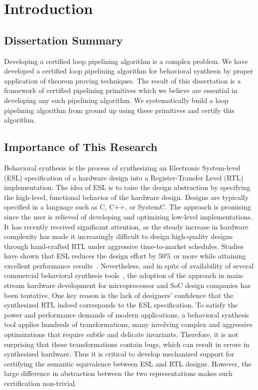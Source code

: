 \chapter{Introduction}
\label{sec:dissertation-thesis}

\section {Dissertation Summary}
Developing a certified loop pipelining algorithm is a complex problem.
We have developed a certified loop pipelining
algorithm for behavioral synthesis by proper %
application of theorem proving techniques.
The result of this dissertation is a
framework of certified pipelining primitives which we believe
are essential in developing any such pipelining algorithm. We systematically
build a loop pipelining algorithm from ground up using these primitives and certify this algorithm.

\section {Importance of This Research}
Behavioral synthesis is the process of synthesizing an
Electronic System-level (ESL) specification of a hardware
design into a Register-Transfer Level (RTL) implementation.
The idea of ESL is to raise the design abstraction by specifying the high-level,
functional behavior of the hardware design. Designs are
typically specified in a language such as C, C++, or SystemC.
The approach is promising since the user is relieved of
developing and optimizing low-level
implementations. It has recently received significant
attention, as the steady increase in hardware complexity has
made it increasingly difficult to design high-quality
designs through hand-crafted RTL under aggressive
time-to-market schedules. Studies have shown that ESL
reduces the design effort by $50\%$ or more while attaining
excellent performance results~\cite{Moussa99}.
Nevertheless, and in spite of availability of several
commercial behavioral synthesis tools~\cite{ctos,forte,vivado},
the adoption of the approach in main-stream hardware development for
microprocessor and SoC design companies has been tentative.
One key reason is the lack of designers' confidence that
the synthesized RTL indeed corresponds to the ESL
specification. To satisfy the power and performance demands
of modern applications, a behavioral synthesis tool applies
hundreds of transformations, many involving complex and
aggressive optimizations that require subtle and delicate
invariants. Therefore, it is not surprising that these transformations
contain bugs, which can result in errors in synthesized
hardware.  Thus it is critical to develop mechanized support
for certifying the semantic equivalence between ESL and RTL
designs. However, the large difference in
abstraction between the two representations makes such
certification non-trivial.

